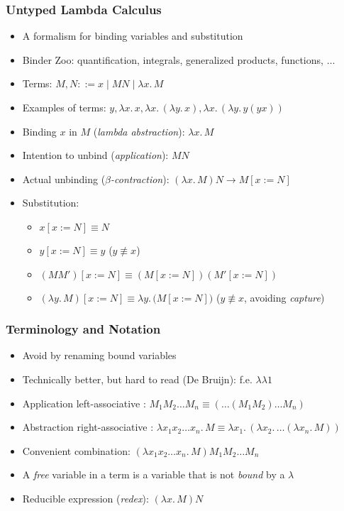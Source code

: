 \documentclass[handout]{beamer}
\newcommand{\lam}[2]{\lambda{#1.\,#2}}
\begin{document}
\frame
  {
  
    \frametitle{Untyped Lambda Calculus}

    \begin{itemize}[<+->]
    \item A formalism for binding variables and substitution
    \item Binder Zoo: quantification, integrals, generalized products, {\color{red}functions}, $\ldots$
    \item Terms: $M,N ::= x \mid MN \mid \lam{x}{M}$
    \item Examples of terms: $y, \lam{x}{x}, \lam{x}{(\lam{y}{x})},\lam{x}{(\lam{y}{y(yx)})}$
    \item Binding $x$ in $M$ (\emph{lambda abstraction}): $\lam{x}{M}$
    \item Intention to unbind (\emph{application}): $MN$
    \item Actual unbinding (\emph{$\beta$-contraction}): $(\lam{x}{M})N \to M[x:=N]$
    \item Substitution:
          \begin{itemize}
          \item $x[x:=N] \equiv N$
          \item $y[x:=N] \equiv y$ ($y\not\equiv x$)
          \item $(MM')[x:=N] \equiv (M[x:=N])(M'[x:=N])$
          \item $(\lam{y}{M})[x:=N] \equiv \lam{y}({M}[x:=N])$ ($y\not\equiv x$, avoiding \emph{capture})
          \end{itemize}
    \end{itemize}
  }

\frame
  {
  
    \frametitle{Terminology and Notation}

    \begin{itemize}[<+->]
    \item Avoid by renaming bound variables
    \item Technically better, but hard to read (De Bruijn): f.e. $\lambda\lambda1$
    \item Application left-associative : $M_1 M_2 \ldots M_n \equiv (\ldots(M_1 M_2) \ldots M_n)$
    \item Abstraction right-associative : $\lam{x_1 x_2 \ldots x_n}{M} \equiv \lam{x_1}{(\lam{x_2}{\ldots(\lam{x_n}{M})})}$
    \item Convenient combination: $(\lam{x_1 x_2 \ldots x_n}{M})M_1 M_2 \ldots M_n$
    \item A \emph{free} variable in a term is a variable that is not \emph{bound} by a $\lambda$
    \item Reducible expression (\emph{redex}): $(\lam{x}{M})N$
    \end{itemize}
  }
\end{document}
